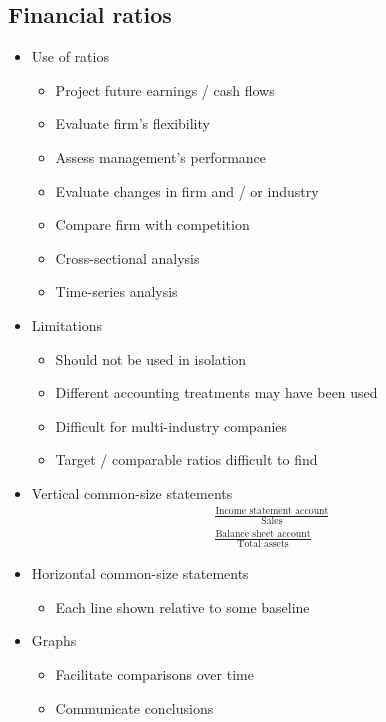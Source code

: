 \documentclass[../notes_compiled.tex]{subfiles}
\begin{document}
\subsection{Financial ratios}
\begin{itemize}
\item Use of ratios
\begin{itemize}
\item Project future earnings / cash flows
\item Evaluate firm's flexibility
\item Assess management's performance
\item Evaluate changes in firm and / or industry
\item Compare firm with competition
\item Cross-sectional analysis
\item Time-series analysis
\end{itemize}

\item Limitations
\begin{itemize}
\item Should not be used in isolation
\item Different accounting treatments may have been used
\item Difficult for multi-industry companies
\item Target / comparable ratios difficult to find
\end{itemize}

\item Vertical common-size statements
\begin{gather*}
\frac{\text{Income statement account}}{\text{Sales}} \\
\frac{\text{Balance sheet account}}{\text{Total assets}}
\end{gather*}

\item Horizontal common-size statements
\begin{itemize}
\item Each line shown relative to some baseline
\end{itemize}

\item Graphs
\begin{itemize}
\item Facilitate comparisons over time 
\item Communicate conclusions
\end{itemize}


\end{itemize}
\end{document}
